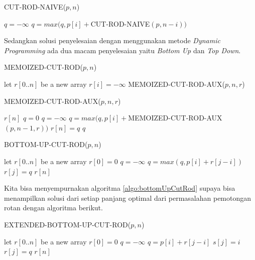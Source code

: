 \begin{algorithm}[H]
	\caption{CUT-ROD-NAIVE($p,n$)}
	\label{algo:cutRodNaive}
	\begin{algorithmic}[1]
		\ENDIF
		\STATE $q=-\infty$
			\STATE $q= max(q, p[i] + $CUT-ROD-NAIVE$(p,n-i))$
		\ENDFOR
	\end{algorithmic}
\end{algorithm}

Sedangkan solusi penyelesaian dengan menggunakan metode \textit{Dynamic Programming} ada dua macam penyelesaian yaitu \textit{Bottom Up} dan \textit{Top Down}.

\begin{algorithm}[H]
	\caption{MEMOIZED-CUT-ROD($p,n$)}
	\label{algo:memoizedCutRod}
	\begin{algorithmic}[1]
		\STATE let $r[0..n]$ be a new array
			\STATE $r[i]=-\infty$
		\ENDFOR
		\RETURN MEMOIZED-CUT-ROD-AUX($p,n,r$)
	\end{algorithmic}
\end{algorithm}

\begin{algorithm}[H]
	\caption{MEMOIZED-CUT-ROD-AUX($p,n,r$)}
	\label{algo:memoizedCutRodAux}
	\begin{algorithmic}[1]
			\RETURN $r[n]$
		\ENDIF
			\STATE $q=0$
		\ELSE
			\STATE $q=-\infty$
				\STATE $q=max(q,p[i]+$MEMOIZED-CUT-ROD-AUX$(p,n-1,r))$
			\ENDFOR
		\ENDIF
		\STATE $r[n]=q$
		\RETURN $q$
	\end{algorithmic}
\end{algorithm}

\begin{algorithm}[H]
	\caption{BOTTOM-UP-CUT-ROD($p,n$)}
	\label{algo:bottomUpCutRod}
	\begin{algorithmic}[1]
		\STATE let $r[0..n]$ be a new array
		\STATE $r[0] = 0$
			\STATE $q=-\infty$
				\STATE $q=max(q,p[i]+r[j-i])$
			\ENDFOR
			\STATE $r[j] = q$
		\ENDFOR
		\RETURN $r[n]$
	\end{algorithmic}
\end{algorithm}

Kita bisa menyempurnakan algoritma \ref{algo:bottomUpCutRod} supaya bisa menampilkan solusi dari setiap panjang optimal dari permasalahan pemotongan rotan dengan algoritma berikut.

\begin{algorithm}[H]
	\caption{EXTENDED-BOTTOM-UP-CUT-ROD($p,n$)}
	\label{algo:extBottomUpCutRod}
	\begin{algorithmic}[1]
		\STATE let $r[0..n]$ be a new array
		\STATE $r[0] = 0$
			\STATE $q=-\infty$
					\STATE $q=p[i]+r[j-i]$
					\STATE $s[j]=i$
				\ENDIF
			\ENDFOR
			\STATE $r[j] = q$
		\ENDFOR
		\RETURN $r[n]$
	\end{algorithmic}
\end{algorithm}

